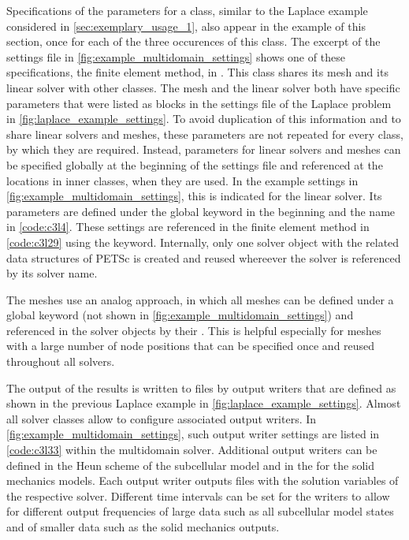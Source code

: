 Specifications of the parameters for a  class, similar to the Laplace example considered in \cref{sec:exemplary_usage_1}, also appear in the example of this section, once for each of the three occurences of this class. The excerpt of the settings file in \cref{fig:example_multidomain_settings} shows one of these specifications, the  finite element method, in . 
This  class shares its mesh and its linear solver with other classes. The mesh and the linear solver both have specific parameters that were listed as blocks in the settings file of the Laplace problem in \cref{fig:laplace_example_settings}. To avoid duplication of this information and to share linear solvers and meshes, these parameters are not repeated for every class, by which they are required. Instead, parameters for linear solvers and meshes can be specified globally at the beginning of the settings file and referenced at the locations in inner classes, when they are used. In the example settings in \cref{fig:example_multidomain_settings}, this is indicated for the linear solver. Its parameters are defined under the global  keyword  in the beginning and the name  in \cref{code:c3l4}. These settings are referenced in the finite element method in \cref{code:c3l29} using the  keyword. Internally, only one solver object with the related data structures of PETSc is created and reused whereever the solver is referenced by its solver name.

The meshes use an analog approach, in which all meshes can be defined under a global  keyword (not shown in \cref{fig:example_multidomain_settings}) and referenced in the solver objects by their . This is helpful especially for meshes with a large number of node positions that can be specified once and reused throughout all solvers.

The output of the results is written to files by output writers that are defined as shown in the previous Laplace example in \cref{fig:laplace_example_settings}. Almost all solver classes allow to configure associated output writers. In \cref{fig:example_multidomain_settings}, such output writer settings are listed in \cref{code:c3l33} within the multidomain solver. Additional output writers can be defined in the Heun scheme of the subcellular model and in the  for the solid mechanics models. Each output writer outputs files with the solution variables of the respective solver. Different time intervals can be set for the writers to allow for different output frequencies of large data such as all subcellular model states and of smaller data such as the solid mechanics outputs.

